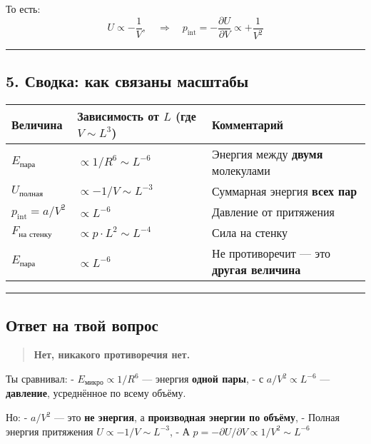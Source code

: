 \documentclass[11pt]{article}
\begin{document}
 То есть:\\
\[
U \propto -\frac{1}{V}, \quad \Rightarrow \quad p_{\text{int}} = -\frac{\partial U}{\partial V} \propto +\frac{1}{V^2}
\]

\begin{center}\rule{0.5\linewidth}{\linethickness}\end{center}

\subsection{5. Сводка: как связаны
масштабы}\label{ux441ux432ux43eux434ux43aux430-ux43aux430ux43a-ux441ux432ux44fux437ux430ux43dux44b-ux43cux430ux441ux448ux442ux430ux431ux44b}

\begin{longtable}[]{@{}lll@{}}
\toprule
Величина & Зависимость от \(L\) (где \(V \sim L^3\)) &
Комментарий\tabularnewline
\midrule
\endhead
\(E_{\text{пара}}\) & \(\propto 1/R^6 \sim L^{-6}\) & Энергия между
\textbf{двумя} молекулами\tabularnewline
\(U_{\text{полная}}\) & \(\propto -1/V \sim L^{-3}\) & Суммарная энергия
\textbf{всех пар}\tabularnewline
\(p_{\text{int}} = a/V^2\) & \(\propto L^{-6}\) & Давление от
притяжения\tabularnewline
\(F_{\text{на стенку}}\) & \(\propto p \cdot L^2 \sim L^{-4}\) & Сила на
стенку\tabularnewline
\(E_{\text{пара}}\) & \(\propto L^{-6}\) & Не противоречит --- это
\textbf{другая величина}\tabularnewline
\bottomrule
\end{longtable}

\begin{center}\rule{0.5\linewidth}{\linethickness}\end{center}

\subsection{Ответ на твой
вопрос}\label{ux43eux442ux432ux435ux442-ux43dux430-ux442ux432ux43eux439-ux432ux43eux43fux440ux43eux441}

\begin{quote}
\textbf{Нет, никакого противоречия нет.}
\end{quote}

Ты сравнивал: - \(E_{\text{микро}} \propto 1/R^6\) --- энергия
\textbf{одной пары}, - с \(a/V^2 \propto L^{-6}\) --- \textbf{давление},
усреднённое по всему объёму.

Но: - \(a/V^2\) --- это \textbf{не энергия}, а \textbf{производная
энергии по объёму}, - Полная энергия притяжения
\(U \propto -1/V \sim L^{-3}\), - А
\(p = -\partial U / \partial V \propto 1/V^2 \sim L^{-6}\)
\end{document}
